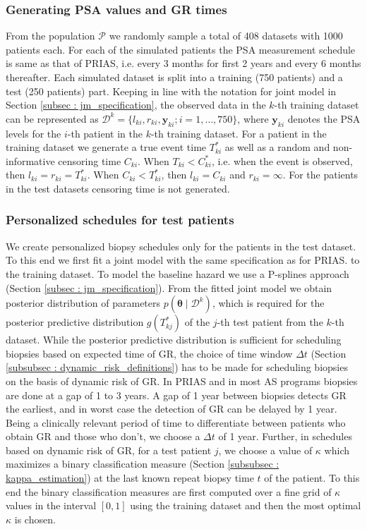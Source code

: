 \subsubsection{Generating PSA values and GR times}
From the population $\mathcal{P}$ we randomly sample a total of 408 datasets with 1000 patients each. For each of the simulated patients the PSA measurement schedule is same as that of PRIAS, i.e. every 3 months for first 2 years and every 6 months thereafter. Each simulated dataset is split into a training (750 patients) and a test (250 patients) part. Keeping in line with the notation for joint model in Section \ref{subsec : jm_specification}, the observed data in the $k$-th training dataset can be represented as $\mathcal{D}^k = \{l_{ki}, r_{ki}, \boldsymbol{y}_{ki}; i = 1, \ldots, 750\}$, where $\boldsymbol{y}_{ki}$ denotes the PSA levels for the $i$-th patient in the $k$-th training dataset. For a patient in the training dataset we generate a true event time $T^*_{ki}$ as well as a random and non-informative censoring time $C_{ki}$. When $T_{ki} < C^*_{ki}$, i.e. when the event is observed, then $l_{ki} = r_{ki} = T^*_{ki}$. When $C_{ki} < T^*_{ki}$, then $l_{ki} = C_{ki}$ and $r_{ki} = \infty$. For the patients in the test datasets censoring time is not generated. 

\subsubsection{Personalized schedules for test patients}
\label{subsubsec : sim_study_pers_sched_details}
We create personalized biopsy schedules only for the patients in the test dataset. To this end we first fit a joint model with the same specification as for PRIAS. to the training dataset. To model the baseline hazard we use a P-splines approach (Section \ref{subsec : jm_specification}). From the fitted joint model we obtain posterior distribution of parameters $p(\boldsymbol{\theta} \mid \mathcal{D}^k)$, which is required for the posterior predictive distribution $g(T^*_{kj})$ of the $j$-th test patient from the $k$-th dataset. While the posterior predictive distribution is sufficient for scheduling biopsies based on expected time of GR, the choice of time window $\Delta t$ (Section \ref{subsubsec : dynamic_risk_definitions}) has to be made for scheduling biopsies on the basis of dynamic risk of GR. In PRIAS and in most AS programs biopsies are done at a gap of 1 to 3 years. A gap of 1 year between biopsies detects GR the earliest, and in worst case the detection of GR can be delayed by 1 year. Being a clinically relevant period of time to differentiate between patients who obtain GR and those who don't, we choose a $\Delta t$ of 1 year. Further, in schedules based on dynamic risk of GR, for a test patient $j$, we choose a value of $\kappa$ which maximizes a binary classification measure (Section \ref{subsubsec : kappa_estimation}) at the last known repeat biopsy time $t$ of the patient. To this end the binary classification measures are first computed over a fine grid of $\kappa$ values in the interval $[0,1]$ using the training dataset and then the most optimal $\kappa$ is chosen.

